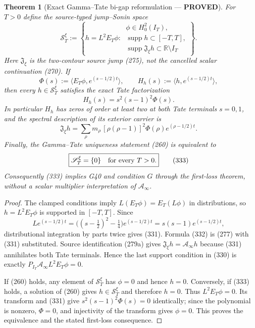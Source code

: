 \documentclass[11pt]{article}
\newtheorem{theorem}{Theorem}
\newcommand{\PROVED}{\textcolor{green!45!black}{\textbf{PROVED}}}
\begin{document}
\begin{theorem}[Exact Gamma--Tate bi-gap reformulation --- \PROVED]
For $T>0$ define the source-typed jump--Sonin space
\begin{equation}
 \mathscr S_T^\xi:=\left\{h=L^2E_T\phi:\
 \begin{array}{l}
   \phi\in H_0^2(I_T),\\
   \operatorname{supp}h\subset[-T,T],\\
   \operatorname{supp}\mathfrak J_\xi h
        \subset\mathbb R\setminus I_T
 \end{array}\right\}.                               \tag{330}
\end{equation}
Here $\mathfrak J_\xi$ is the two-contour source jump (275), not the
cancelled scalar continuation (270).  If
\begin{equation}
 \Phi(s):=\langle E_T\phi,e^{(s-1/2)t}\rangle,
 \qquad H_h(s):=\langle h,e^{(s-1/2)t}\rangle,
\end{equation}
then every $h\in\mathscr S_T^\xi$ satisfies the exact Tate factorization
\begin{equation}
 \boxed{H_h(s)=s^2(s-1)^2\Phi(s).}                   \tag{331}
\end{equation}
In particular $H_h$ has zeros of order at least two at both Tate terminals
$s=0,1$, and the spectral description of its exterior carrier is
\begin{equation}
 \mathfrak J_\xi h
 =\sum_\rho m_\rho\,[\rho(\rho-1)]^2\Phi(\rho)
             e^{(\rho-1/2)t}.                       \tag{332}
\end{equation}
Finally, the Gamma--Tate uniqueness statement (260) is equivalent to
\begin{equation}
 \boxed{\mathscr S_T^\xi=\{0\}\quad\hbox{for every }T>0.} \tag{333}
\end{equation}
Consequently (333) implies G40 and condition $G$ through the first-loss
theorem, without a scalar multiplier interpretation of $\mathcal A_\infty$.
\end{theorem}

\begin{proof}
The clamped conditions imply
$L(E_T\phi)=E_T(L\phi)$ in distributions, so
$h=L^2E_T\phi$ is supported in $[-T,T]$.  Since
\[
 L e^{(s-1/2)t}=\bigl((s-\tfrac12)^2-\tfrac14\bigr)
                    e^{(s-1/2)t}
                 =s(s-1)e^{(s-1/2)t},
\]
distributional integration by parts twice gives (331).  Formula (332) is
(277) with (331) substituted.  Source identification (279a) gives
$\mathfrak J_\xi h=\mathcal A_\infty h$ because (331) annihilates both
Tate terminals.  Hence the last support condition in (330) is exactly
$P_{I_T}\mathcal A_\infty L^2E_T\phi=0$.

If (260) holds, any element of $\mathscr S_T^\xi$ has $\phi=0$ and hence
$h=0$.  Conversely, if (333) holds, a solution of (260) gives
$h\in\mathscr S_T^\xi$ and therefore $h=0$.  Thus
$L^2E_T\phi=0$.  Its transform and (331) give
$s^2(s-1)^2\Phi(s)=0$ identically; since the polynomial is nonzero,
$\Phi=0$, and injectivity of the transform gives $\phi=0$.  This proves the
equivalence and the stated first-loss consequence.
\end{proof}
\end{document}
